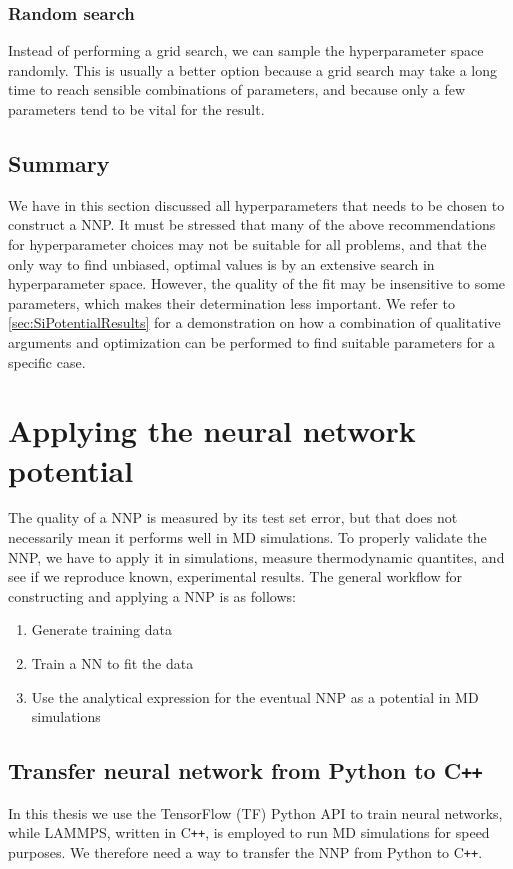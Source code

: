 \documentclass[twoside,english]{uiofysmaster}
\begin{document}
\subsubsection{Random search}
Instead of performing a grid search, we can sample the hyperparameter space randomly. This is usually a better option because 
a grid search may take a long time to reach sensible combinations of parameters, and because only a few parameters
tend to be vital for the result. 

\subsection{Summary}
We have in this section discussed all hyperparameters that needs to be chosen to construct a NNP. 
It must be stressed that many of the above recommendations for hyperparameter choices may not be suitable 
for all problems, and that the only way to find unbiased, optimal values is by an extensive search 
in hyperparameter space. However, the quality of the fit may be insensitive to some parameters, which makes their 
determination less important. 
We refer to \autoref{sec:SiPotentialResults} for a demonstration on how 
a combination of qualitative arguments and optimization can be performed to find suitable parameters 
for a specific case. 



\section{Applying the neural network potential} \label{sec:applyingNNP}
The quality of a NNP is measured by its test set error, but that does not necessarily mean it performs 
well in MD simulations. To properly validate the NNP, we have to apply it in simulations, measure thermodynamic quantites, 
and see if we reproduce known, experimental results. 
The general workflow for constructing and applying a NNP is as follows: 
\begin{enumerate}
 \item Generate training data
 \item Train a NN to fit the data
 \item Use the analytical expression for the eventual NNP as a potential in MD simulations
\end{enumerate}

\subsection{Transfer neural network from Python to C\texttt{++}} \label{sec:transferNN}
In this thesis we use the TensorFlow (TF) Python API to train neural networks, while LAMMPS, written in C\texttt{++}, is
employed to run MD simulations for speed purposes. 
We therefore need a way to transfer the NNP from Python to C\texttt{++}. 
\end{document}
